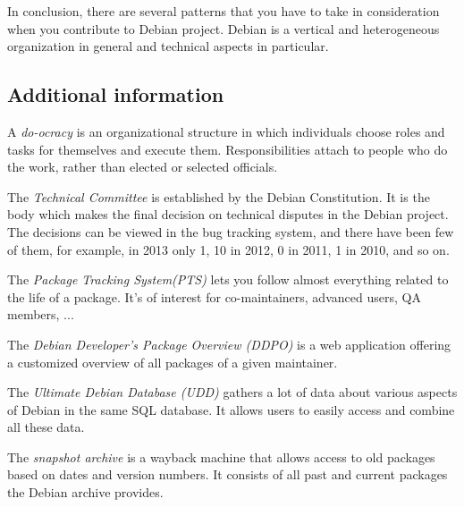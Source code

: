 \documentclass[11pt]{article}
\begin{document}
In conclusion, there are several patterns that you have to take in consideration when you contribute to Debian project. Debian is a vertical and heterogeneous organization in general and technical aspects in particular.

\subsection{Additional information}
A \emph{do-ocracy} is an organizational structure in which individuals choose roles and tasks for themselves and execute them. Responsibilities attach to people who do the work, rather than elected or selected officials.

The \emph{Technical Committee} is established by the Debian Constitution. It is the body which makes the final decision on technical disputes in the Debian project. The decisions can be viewed in the bug tracking system, and there have been few of them, for example, in 2013 only 1, 10 in 2012, 0 in 2011, 1 in 2010, and so on.

The \emph{Package Tracking System(PTS)} lets you follow almost everything related to the life of a package. It's of interest for co-maintainers, advanced users, QA members, ...

The \emph{Debian Developer's Package Overview (DDPO)} is a web application offering a customized overview of all packages of a given maintainer. 

The \emph{Ultimate Debian Database (UDD)} gathers a lot of data about various aspects of Debian in the same SQL database. It allows users to easily access and combine all these data.

The \emph{snapshot archive }is a wayback machine that allows access to old packages based on dates and version numbers. It consists of all past and current packages the Debian archive provides. 

\newpage




 \nocite{*}
\end{document}

